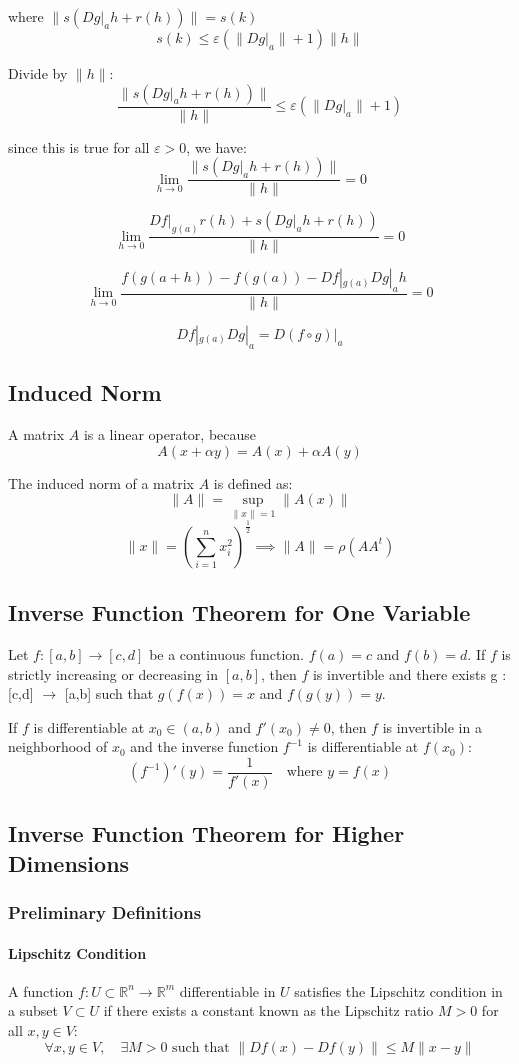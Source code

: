 \documentclass[11pt]{article}
\begin{document}
where $\|s(Dg|_{a} h + r(h))\| = s(k)$ 
\[
s(k) \leq \varepsilon \left( \| Dg|_{a} \| + 1 \right) \| h \|
\]

Divide by $\| h \|$:
\[
\frac{\| s(Dg|_{a} h + r(h)) \|}{\| h \|} \leq \varepsilon \left( \| Dg|_{a} \| + 1 \right)
\]

since this is true for all $\varepsilon > 0$, we have:
\[
\lim_{h \to 0} \frac{\| s(Dg|_{a} h + r(h)) \|}{\| h \|} = 0
\]

\[
\lim_{h \to 0} \frac{Df|_{g(a)} r(h) + s(Dg|_{a} h + r(h))}{\| h \|} = 0
\]

\[
\lim_{h \to 0} \frac{f(g(a+h)) - f(g(a)) - Df|_{g(a)} Dg|_{a} h}{\| h \|} = 0
\]

\[
Df|_{g(a)} Dg|_{a} = D(f \circ g)|_{a}
\]

\subsection{Induced Norm}
A matrix $A$ is a linear operator, because
\[
A(x + \alpha y) = A(x) + \alpha A(y)
\]

The induced norm of a matrix $A$ is defined as:
\[
\| A \| = \sup_{\|x\| = 1} \| A(x) \|
\]
\[
\|x\| = \left(\sum_{i=1}^{n} x_i^2 \right)^{\frac{1}{2}} \implies \|A\| = \rho (AA^t)
\]

\subsection{Inverse Function Theorem for One Variable}
Let $f : [a,b] \rightarrow [c,d]$ be a continuous function. $f(a) = c$ and $f(b) = d$. If $f$ is strictly increasing or decreasing in $[a,b]$, then $f$ is invertible and there exists g : [c,d] $\rightarrow$ [a,b] such that $g(f(x)) = x$ and $f(g(y)) = y$.

If $f$ is differentiable at $x_0 \in (a,b)$ and $f'(x_0) \neq 0$, then $f$ is invertible in a neighborhood of $x_0$ and the inverse function $f^{-1}$ is differentiable at $f(x_0)$:
\[
(f^{-1})'(y) = \frac{1}{f'(x)} \quad \text{where } y = f(x)
\]

\subsection{Inverse Function Theorem for Higher Dimensions}
\subsubsection{Preliminary Definitions}
\paragraph{Lipschitz Condition}
A function $f : U \subset \mathbb{R}^n \rightarrow \mathbb{R}^m$ differentiable in $U$ satisfies the Lipschitz condition in a subset $V \subset U$ if there exists a constant known as the Lipschitz ratio $M > 0$ for all $x,y \in V$:
\[
\forall x,y \in V, \quad \exists M > 0 \text{ such that } \| Df(x) - Df(y) \| \leq M \| x - y \|
\]
\end{document}
